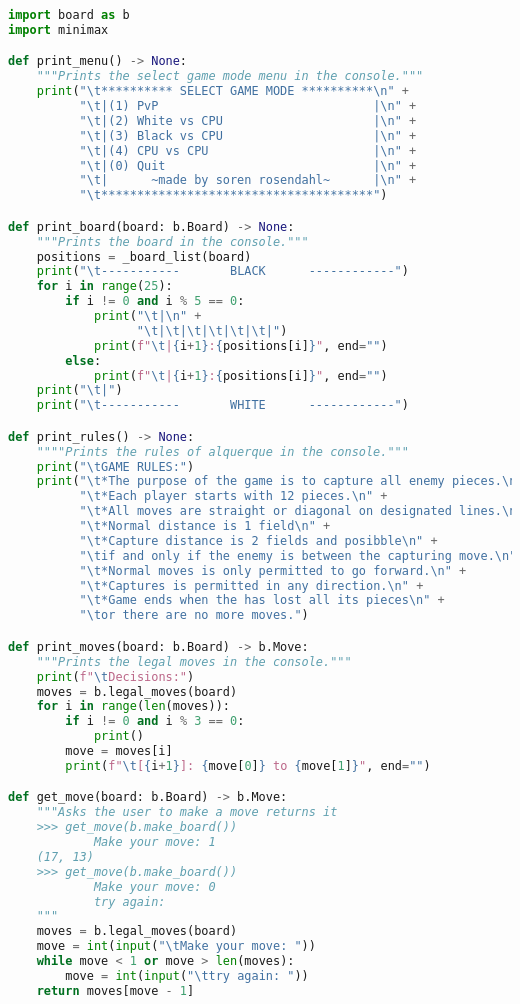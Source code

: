 \documentclass{article}
\begin{document}
\begin{lstlisting}[language=Python, caption={kildekode}, label={code:kildekode}]
import board as b
import minimax

def print_menu() -> None:
    """Prints the select game mode menu in the console."""
    print("\t********** SELECT GAME MODE **********\n" +
          "\t|(1) PvP                              |\n" +
          "\t|(2) White vs CPU                     |\n" +
          "\t|(3) Black vs CPU                     |\n" +
          "\t|(4) CPU vs CPU                       |\n" +
          "\t|(0) Quit                             |\n" +
          "\t|      ~made by soren rosendahl~      |\n" +
          "\t**************************************")

def print_board(board: b.Board) -> None:
    """Prints the board in the console."""
    positions = _board_list(board)
    print("\t-----------       BLACK      ------------")
    for i in range(25):
        if i != 0 and i % 5 == 0:
            print("\t|\n" + 
                  "\t|\t|\t|\t|\t|\t|")
            print(f"\t|{i+1}:{positions[i]}", end="")
        else:
            print(f"\t|{i+1}:{positions[i]}", end="")
    print("\t|")
    print("\t-----------       WHITE      ------------")

def print_rules() -> None:
    """"Prints the rules of alquerque in the console."""
    print("\tGAME RULES:")
    print("\t*The purpose of the game is to capture all enemy pieces.\n" + 
          "\t*Each player starts with 12 pieces.\n" +
          "\t*All moves are straight or diagonal on designated lines.\n" +
          "\t*Normal distance is 1 field\n" +
          "\t*Capture distance is 2 fields and posibble\n" +
          "\tif and only if the enemy is between the capturing move.\n" +
          "\t*Normal moves is only permitted to go forward.\n" +
          "\t*Captures is permitted in any direction.\n" +
          "\t*Game ends when the has lost all its pieces\n" + 
          "\tor there are no more moves.")

def print_moves(board: b.Board) -> b.Move:
    """Prints the legal moves in the console."""
    print(f"\tDecisions:")
    moves = b.legal_moves(board)
    for i in range(len(moves)):
        if i != 0 and i % 3 == 0:
            print()
        move = moves[i]
        print(f"\t[{i+1}]: {move[0]} to {move[1]}", end="")

def get_move(board: b.Board) -> b.Move:
    """Asks the user to make a move returns it
    >>> get_move(b.make_board())
            Make your move: 1
    (17, 13)
    >>> get_move(b.make_board())
            Make your move: 0
            try again:
    """
    moves = b.legal_moves(board)
    move = int(input("\tMake your move: "))
    while move < 1 or move > len(moves):
        move = int(input("\ttry again: "))
    return moves[move - 1]


\end{lstlisting}
\end{document}
